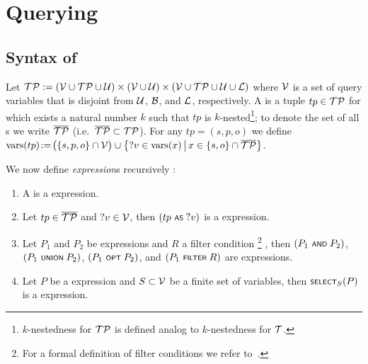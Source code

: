 \section{Querying}

\subsection{Syntax of {\SPARQLplus}}

	Let $\mathcal{TP} := (\mathcal{V} \cup \mathcal{TP} \cup \mathcal{U}) \times (\mathcal{V} \cup \mathcal{U}) \times (\mathcal{V} \cup \mathcal{TP} \cup \mathcal{U} \cup \mathcal{L})$ where $\mathcal{V}$ is a set of query variables that is disjoint from $\mathcal{U}$, $\mathcal{B}$, and $\mathcal{L}$, respectively.
A \emph{\TPplus} is a tuple $tp \in \mathcal{TP}$ for which exists a natural number $k$ such that $tp$ is $k$-nested\footnote{$k$-nestedness for $\mathcal{TP}$ is defined analog to $k$-nestedness for $\mathcal{T}$.}; to denote the set of all {\TPplus}s we write $\overline{\mathcal{TP}}$ (i.e.~$\overline{\mathcal{TP}} \subset \mathcal{TP}$).
	For any {\TPplus} $tp \!=\! (s,p,o)$ we define $\mathrm{vars}(tp) \!:=\! \bigl( \lbrace s,p,o \rbrace \cap \mathcal{V} \bigr) \cup \big\lbrace ?v \in \mathrm{vars}(x) \,\big|\, x \in \lbrace s,o \rbrace \cap \overline{\mathcal{TP}} \big\rbrace$.

	We now define \emph{{\SPARQLplus} expression}s recursively :
\begin{enumerate}
	\item A \emph{\TPplus} is a {\SPARQLplus} expression.
	\item Let $tp \in \overline{\mathcal{TP}}$ and $?v \in \mathcal{V}$, then $(tp \text{ \normalfont\scriptsize\textsf{AS} } ?v)$ is a {\SPARQLplus} expression.
	\item Let $P_1$ and $P_2$ be {\SPARQLplus} expressions and $R$ a filter condition%
		\footnote{For a formal definition of
		filter conditions we refer to~\cite{Perez09:SemanticsAndComplexityOfSPARQL}.}%
	, then $(P_1 \text{ \normalfont\scriptsize\textsf{AND} } P_2)$, $(P_1 \text{ \normalfont\scriptsize\textsf{UNION} } P_2)$, $(P_1 \text{ \normalfont\scriptsize\textsf{OPT} } P_2)$, and $(P_1 \text{ \normalfont\scriptsize\textsf{FILTER} } R)$ are {\SPARQLplus} expressions.
	\item Let $P$ be a {\SPARQLplus} expression and $S \subset \mathcal{V}$ be a finite set of variables, then $\text{\normalfont\scriptsize\textsf{SELECT}}_S(P)$ is a {\SPARQLplus} expression.
\end{enumerate}



